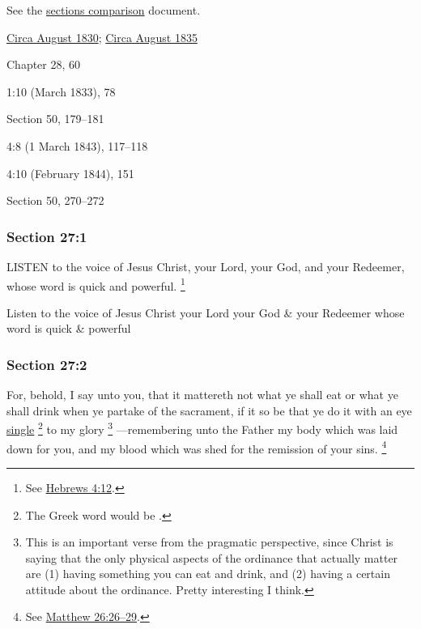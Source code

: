 		See the \href{https://drive.google.com/file/d/1goAvNz8jS4R8slYfMG_db55Ty2z_vmgK/view?usp=sharing}{sections comparison} document.
	
		\begin{compactdesc}
			\item[JSP] \hyperref[EMS-1830-JS-CIR-AUG-1830]{Circa August 1830}; \hyperref[EMS-1835-JS-CIR-AUG-1835]{Circa August 1835}
			\item[BC] Chapter 28, 60
			\item[EMS] 1:10 (March 1833), 78
			\item[DC 1835] Section 50, 179--181
			\item[TS] 4:8 (1 March 1843), 117--118
			\item[MS] 4:10 (February 1844), 151
			\item[DC 1844] Section 50, 270--272
		\end{compactdesc}

	\subsubsection{Section 27:1} %
		\label{DC27-1}

		LISTEN to the voice of Jesus Christ, your Lord, your God, and your Redeemer, whose word is quick and powerful.%
			\footnote{%
				See \hyperref[HEBREWS-4-12]{Hebrews 4:12}.
				}

		\begin{framed}
		\scriptsize
			\begin{compactdesc}
				\item[JSP] Listen to the voice of Jesus Christ your Lord your God \& your Redeemer whose word is quick \& powerful
			\end{compactdesc}
		\end{framed}

	\subsubsection{Section 27:2} %
		\label{DC27-2}

		For, behold, I say unto you, that it mattereth not what ye shall eat or what ye shall drink when ye partake of the sacrament, if it so be that ye do it with an eye \hyperref[SINGLE]{single}%
			\footnote{%
				The Greek word would be \hyperref[HAPLOUS]{}.
				}
		to my glory%
			\footnote{%
				This is an important verse from the pragmatic perspective, since Christ is saying that the only physical aspects of the ordinance that actually matter are (1) having something you can eat and drink, and (2) having a certain attitude about the ordinance. Pretty interesting I think.
				}%
		---remembering unto the Father my body which was laid down for you, and my blood which was shed for the remission of your sins.%
			\footnote{%
				See \hyperref[MATTHEW-26-26]{Matthew 26:26--29}.
				} 

